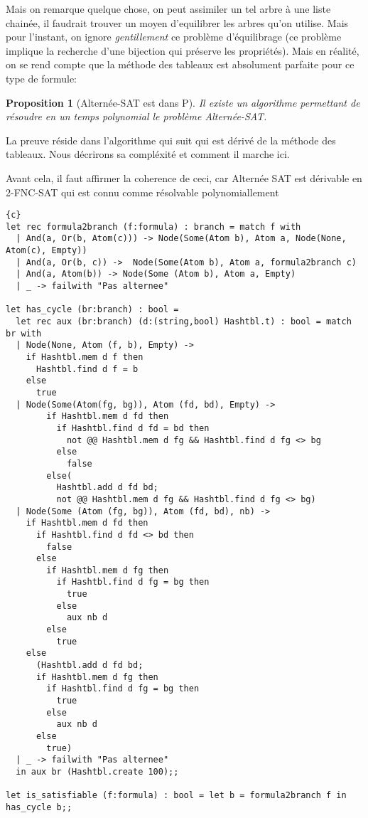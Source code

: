 \documentclass{paper}
\newtheorem{prop}{Proposition}
\begin{document}
Mais on remarque quelque chose, on peut assimiler un tel arbre à une liste chainée, il faudrait trouver un moyen d'equilibrer les arbres qu'on utilise.
Mais pour l'instant, on ignore \textit{gentillement} ce problème d'équilibrage (ce problème implique la recherche d'une bijection qui préserve les propriétés).
Mais en réalité, on se rend compte que la méthode des tableaux est absolument parfaite pour ce type de formule:
\begin{prop}[Alternée-SAT est dans P]
    Il existe un algorithme permettant de résoudre en un temps polynomial le problème Alternée-SAT.
\end{prop}
La preuve réside dans l'algorithme qui suit qui est dérivé de la méthode des tableaux.
Nous décrirons sa compléxité et comment il marche ici.

Avant cela, il faut affirmer la coherence de ceci, car Alternée SAT est dérivable en 2-FNC-SAT qui est connu comme résolvable polynomiallement

\begin{lstlisting}{c}
let rec formula2branch (f:formula) : branch = match f with
  | And(a, Or(b, Atom(c))) -> Node(Some(Atom b), Atom a, Node(None, Atom(c), Empty))
  | And(a, Or(b, c)) ->  Node(Some(Atom b), Atom a, formula2branch c)
  | And(a, Atom(b)) -> Node(Some (Atom b), Atom a, Empty)
  | _ -> failwith "Pas alternee"

let has_cycle (br:branch) : bool = 
  let rec aux (br:branch) (d:(string,bool) Hashtbl.t) : bool = match br with
  | Node(None, Atom (f, b), Empty) -> 
    if Hashtbl.mem d f then 
      Hashtbl.find d f = b
    else
      true
  | Node(Some(Atom(fg, bg)), Atom (fd, bd), Empty) -> 
        if Hashtbl.mem d fd then
          if Hashtbl.find d fd = bd then
            not @@ Hashtbl.mem d fg && Hashtbl.find d fg <> bg
          else 
            false
        else(
          Hashtbl.add d fd bd;
          not @@ Hashtbl.mem d fg && Hashtbl.find d fg <> bg)
  | Node(Some (Atom (fg, bg)), Atom (fd, bd), nb) ->
    if Hashtbl.mem d fd then
      if Hashtbl.find d fd <> bd then
        false
      else
        if Hashtbl.mem d fg then
          if Hashtbl.find d fg = bg then
            true
          else
            aux nb d
        else
          true
    else
      (Hashtbl.add d fd bd;
      if Hashtbl.mem d fg then
        if Hashtbl.find d fg = bg then
          true
        else
          aux nb d
      else
        true)
  | _ -> failwith "Pas alternee"
  in aux br (Hashtbl.create 100);;

let is_satisfiable (f:formula) : bool = let b = formula2branch f in has_cycle b;;
\end{lstlisting}
\end{document}
